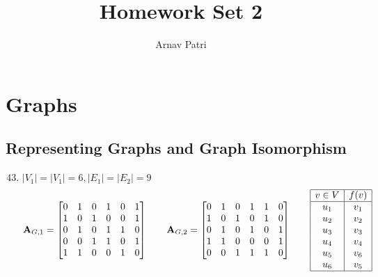 \documentclass[12pt, A4]{article}
\title{Homework Set 2}
\author{Arnav Patri}
\newcommand{\enumset}[1]{\setcounter{enumi}{#1}}
\begin{document}
	\maketitle
	\setcounter{section}{9}
	\section{Graphs}
		\setcounter{subsection}{2}
		\subsection{Representing Graphs and Graph Isomorphism}
		\begin{enumerate}
			\enumset{42}
			\item
				\(|V_1| = |V_1| =  6, |E_1| = |E_2|= 9\)
				\[
					\textbf{A}_{G, 1} = \begin{bmatrix}
 							0 & 1 & 0 & 1 & 0 & 1 \\
 							1 & 0 & 1 & 0 & 0 & 1 \\
 							0 & 1 & 0 & 1 & 1 & 0 \\
 							0 & 0 & 1 & 1 & 0 & 1 \\
 							1 & 1 & 0 & 0 & 1 & 0
 						\end{bmatrix} \qquad
 					\textbf{A}_{G, 2} = \begin{bmatrix}
 							0 & 1 & 0 & 1 & 1 & 0 \\
 							1 & 0 & 1 & 0 & 1 & 0 \\
 							0 & 1 & 0 & 1 & 0 & 1 \\
 							1 & 1 & 0 & 0 & 0 & 1 \\
 							0 & 0 & 1 & 1 & 1 & 0
 						\end{bmatrix} \qquad
 					\begin{array}{|c|c|c}\hline
						v \in V & f(v) \\\hline
						u_1 & v_1 \\
						u_2 & v_2 \\
						u_3 & v_3 \\
						u_4 & v_4 \\
						u_5 & v_6 \\
						u_6 & v_5 \\\hline
					\end{array}
				\]
		\end{enumerate}
\end{document}
